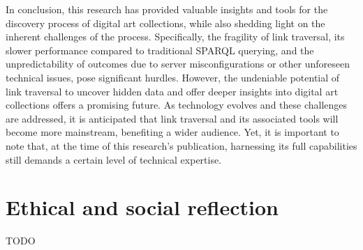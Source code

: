 In conclusion, this research has provided valuable insights and tools for the discovery process of digital art collections, while also shedding light on the inherent challenges of the process. Specifically, the fragility of link traversal, its slower performance compared to traditional SPARQL querying, and the unpredictability of outcomes due to server misconfigurations or other unforeseen technical issues, pose significant hurdles. However, the undeniable potential of link traversal to uncover hidden data and offer deeper insights into digital art collections offers a promising future. As technology evolves and these challenges are addressed, it is anticipated that link traversal and its associated tools will become more mainstream, benefiting a wider audience. Yet, it is important to note that, at the time of this research's publication, harnessing its full capabilities still demands a certain level of technical expertise.

\section*{Ethical and social reflection}

TODO


